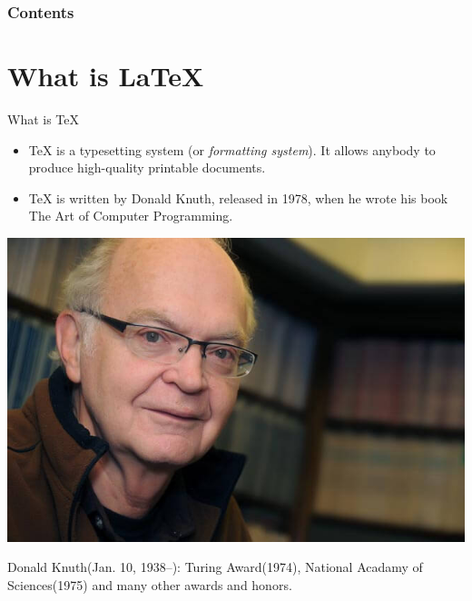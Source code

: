\documentclass[10pt]{beamer}
\date{}
\begin{document}
\begin{frame}
  \maketitle
\end{frame}

\begin{frame}\frametitle<presentation>{Contents}
  \tableofcontents
\end{frame}

\section{What is \LaTeX}
\begin{frame}{What is \TeX}
\begin{itemize}
    \item \TeX{} is a typesetting system (or {\em formatting system}). It 
    allows anybody to produce high-quality printable documents.

    \item \TeX{} is written by Donald Knuth, released in 1978,
    when he wrote his book \alert{The Art of Computer Programming}.
\end{itemize}
\begin{center}
    \includegraphics[width=.55\textwidth]{Donald-Knuth.jpg}
\end{center}
    Donald Knuth(Jan. 10, 1938--): Turing Award(1974),
    National Acadamy of Sciences(1975) and many other awards and honors.
\end{frame}
\end{document}
